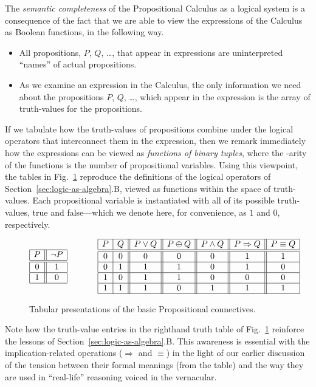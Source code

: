 The {\em semantic completeness} of the Propositional Calculus as a logical system is a consequence of the fact that we are able to view the expressions of the Calculus as Boolean functions, in the following way.
\begin{itemize}
\item
All propositions, $P$, $Q$, \ldots, that appear in expressions are uninterpreted ``names'' of actual propositions.
\medskip\item
As we examine an expression in the Calculus, the only information we need about the propositions $P$, $Q$, \ldots, which appear in the expression is the array of truth-values for the propositions.
\end{itemize}
If we tabulate how the truth-values of propositions combine under the logical operators that interconnect them in the expression, then we remark immediately how the expressions can be viewed as {\em functions of binary tuples}, where the -arity of the functions is the number of propositional variables.  Using this viewpoint, the tables in Fig.~\ref{fig:defns-via-tables} reproduce the definitions of the logical operators of Section~\ref{sec:logic-as-algebra}.B, viewed as functions within the space of truth-values.  Each propositional variable is instantiated with all of its possible truth-values, {\sc true} and {\sc false}---which we denote here, for convenience, as $1$ and $0$, respectively.
\begin{figure}[hbt]
\[
\begin{array}{|c||c|}
\hline
P & \neg P \\
\hline
\hline
0 & 1 \\
\hline
1 & 0 \\
\hline
\end{array}
\hspace*{.5in}
\begin{array}{|c|c||c||c||c||c||c|}
\hline
P & Q & P \vee Q  & P \oplus Q & P \wedge Q & P \Rightarrow Q & P \equiv Q  \\
\hline
\hline
0 & 0 & 0 & 0 & 0 & 1 & 1 \\
\hline
0 & 1 & 1 & 1 & 0 & 1 & 0 \\
\hline
1 & 0 & 1 & 1 & 0 & 0 & 0 \\
\hline
1 & 1 & 1 & 0 & 1 & 1 & 1 \\
\hline
\end{array}
\]
\caption{Tabular presentations of the basic Propositional connectives.
\label{fig:defns-via-tables}}
\end{figure}
Note how the truth-value entries in the righthand truth table of Fig.~\ref{fig:defns-via-tables} reinforce the lessons of Section~\ref{sec:logic-as-algebra}.B.  This awareness is essential with the implication-related operations ($\Rightarrow$ and $\equiv$) in the light of our earlier discussion of the tension between their formal meanings (from the table) and the way they are
used in ``real-life'' reasoning voiced in the vernacular.

